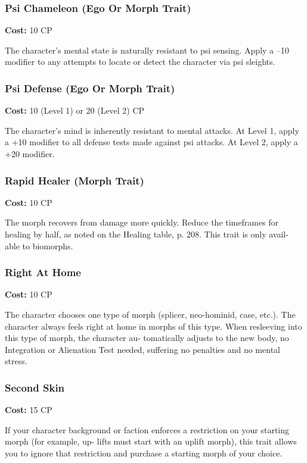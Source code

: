 \subsubsection{Psi Chameleon (Ego Or Morph Trait)}

\textbf{Cost:} 10 CP

The character's mental state is naturally resistant to 
psi sensing. Apply a –10 modifier to any attempts to 
locate or detect the character via psi sleights.

\subsubsection{Psi Defense (Ego Or Morph Trait)}

\textbf{Cost:} 10 (Level 1) or 20 (Level 2) CP

The character's mind is inherently resistant to 
mental attacks. At Level 1, apply a +10 modifier to 
all defense tests made against psi attacks. At Level 2, 
apply a +20 modifier.

\subsubsection{Rapid Healer (Morph Trait)}

\textbf{Cost:} 10 CP

The morph recovers from damage more quickly. 
Reduce the timeframes for healing by half, as noted 
on the Healing table, p. 208. This trait is only avail-
able to biomorphs.

\subsubsection{Right At Home}

\textbf{Cost:} 10 CP

The character chooses one type of morph (splicer, 
neo-hominid, case, etc.). The character always 
feels right at home in morphs of this type. When 
resleeving into this type of morph, the character au-
tomatically adjusts to the new body, no Integration 
or Alienation Test needed, suffering no penalties and 
no mental stress.

\subsubsection{Second Skin}

\textbf{Cost:} 15 CP

If your character background or faction enforces a 
restriction on your starting morph (for example, up-
lifts must start with an uplift morph), this trait allows 
you to ignore that restriction and purchase a starting 
morph of your choice.

